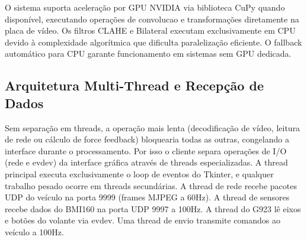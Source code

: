 \begin{table}[!h]
\captionsetup{width=16cm}
\end{table}

O sistema suporta aceleração por \gls{GPU} NVIDIA via biblioteca CuPy quando disponível, executando operações de \gls{convolucao} e transformações diretamente na placa de vídeo. Os filtros \gls{CLAHE} e Bilateral executam exclusivamente em \gls{CPU} devido à complexidade algorítmica que dificulta paralelização eficiente. O fallback automático para CPU garante funcionamento em sistemas sem GPU dedicada.

\subsection{Arquitetura Multi-Thread e Recepção de Dados}
\label{subsec:recepcao-cliente}

Sem separação em threads, a operação mais lenta (decodificação de vídeo, leitura de rede ou cálculo de force feedback) bloquearia todas as outras, congelando a interface durante o processamento. Por isso o cliente separa operações de I/O (rede e evdev) da interface gráfica através de threads especializadas. A thread principal executa exclusivamente o loop de eventos do Tkinter, e qualquer trabalho pesado ocorre em threads secundárias. A thread de rede recebe pacotes \gls{UDP} do veículo na porta 9999 (frames \gls{MJPEG} a 60Hz). A thread de sensores recebe dados do BMI160 na porta \gls{UDP} 9997 a 100Hz. A thread do G923 lê eixos e botões do volante via evdev. Uma thread de envio transmite comandos ao veículo a 100Hz.

